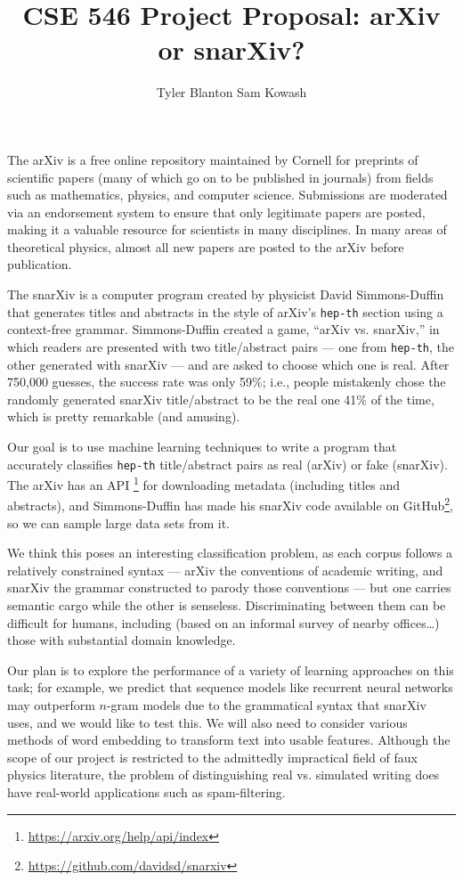\documentclass[11pt,letterpaper]{article}
\author{Tyler Blanton \quad Sam Kowash}
\title{CSE 546 Project Proposal: arXiv or snarXiv?}
\numberwithin{equation}{section}
\numberwithin{figure}{section}
\begin{document}
\maketitle
The arXiv is a free online repository maintained by Cornell for preprints of scientific papers (many of which go on to be published in journals) from fields such as mathematics, physics, and computer science.
Submissions are moderated via an endorsement system to ensure that only legitimate papers are posted, making it a valuable resource for scientists in many disciplines. In many areas of theoretical physics, almost all new papers are posted to the arXiv before publication.

The snarXiv is a computer program created by physicist David Simmons-Duffin that generates titles and abstracts in the style of arXiv's \texttt{hep-th} section using a context-free grammar.
Simmons-Duffin created a game, ``arXiv vs. snarXiv,'' in which readers are presented with two title/abstract pairs --- one from \texttt{hep-th}, the other generated with snarXiv --- and are asked to choose which one is real.
After 750,000 guesses, the success rate was only 59\%; i.e., people mistakenly chose the randomly generated snarXiv title/abstract to be the real one 41\% of the time, which is pretty remarkable (and amusing).

Our goal is to use machine learning techniques to write a program that accurately classifies \texttt{hep-th} title/abstract pairs as real (arXiv) or fake (snarXiv).
The arXiv has an API%
\footnote{\url{https://arxiv.org/help/api/index}}
for downloading metadata (including titles and abstracts), and Simmons-Duffin has made his snarXiv code available on GitHub\footnote{\url{https://github.com/davidsd/snarxiv}}, so we can sample large data sets from it.
%

We think this poses an interesting classification problem, as each corpus follows a relatively constrained syntax --- arXiv the conventions of academic writing, and snarXiv the grammar constructed to parody those conventions --- but one carries semantic cargo while the other is senseless. Discriminating between them can be difficult for humans, including (based on an informal survey of nearby offices\ldots) those with substantial domain knowledge.

Our plan is to explore the performance of a variety of learning approaches on this task; for example, we predict that sequence models like recurrent neural networks may outperform $n$-gram models due to the grammatical syntax that snarXiv uses, and we would like to test this. 
We will also need to consider various methods of word embedding to transform text into usable features.
Although the scope of our project is restricted to the admittedly impractical field of faux physics literature, the problem of distinguishing real vs. simulated writing does have real-world applications such as spam-filtering. 
\end{document}
